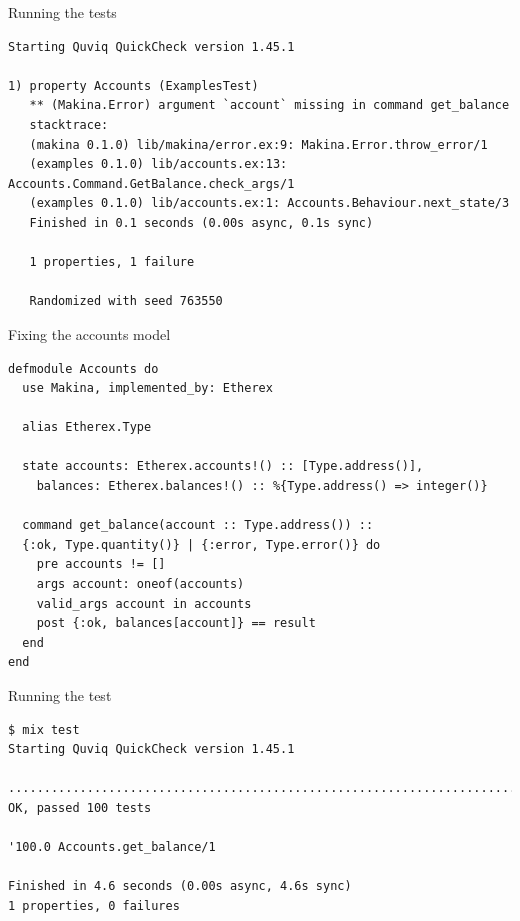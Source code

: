 \documentclass[aspectratio=169, 10pt]{beamer}
\begin{document}
\begin{frame}[label={sec:orgf0088db},fragile]{Running the tests}
 \lstset{language=shell,label= ,caption= ,captionpos=b,numbers=none,style=display}
\begin{lstlisting}
Starting Quviq QuickCheck version 1.45.1

1) property Accounts (ExamplesTest)
   ** (Makina.Error) argument `account` missing in command get_balance
   stacktrace:
   (makina 0.1.0) lib/makina/error.ex:9: Makina.Error.throw_error/1
   (examples 0.1.0) lib/accounts.ex:13: Accounts.Command.GetBalance.check_args/1
   (examples 0.1.0) lib/accounts.ex:1: Accounts.Behaviour.next_state/3
   Finished in 0.1 seconds (0.00s async, 0.1s sync)

   1 properties, 1 failure

   Randomized with seed 763550
\end{lstlisting}
\end{frame}


\begin{frame}[label={sec:orgfb6a0b3},fragile]{Fixing the accounts model}
 \lstset{language=elixir,label= ,caption= ,captionpos=b,numbers=none,style=display}
\begin{lstlisting}
defmodule Accounts do
  use Makina, implemented_by: Etherex

  alias Etherex.Type

  state accounts: Etherex.accounts!() :: [Type.address()],
    balances: Etherex.balances!() :: %{Type.address() => integer()}

  command get_balance(account :: Type.address()) ::
  {:ok, Type.quantity()} | {:error, Type.error()} do
    pre accounts != []
    args account: oneof(accounts)
    valid_args account in accounts
    post {:ok, balances[account]} == result
  end
end
\end{lstlisting}
\end{frame}


\begin{frame}[label={sec:org09fb051},fragile]{Running the test}
 \lstset{language=shell,label= ,caption= ,captionpos=b,numbers=none,style=display}
\begin{lstlisting}
$ mix test
Starting Quviq QuickCheck version 1.45.1

....................................................................................................
OK, passed 100 tests

'100.0 Accounts.get_balance/1

Finished in 4.6 seconds (0.00s async, 4.6s sync)
1 properties, 0 failures
\end{lstlisting}
\end{frame}
\end{document}
